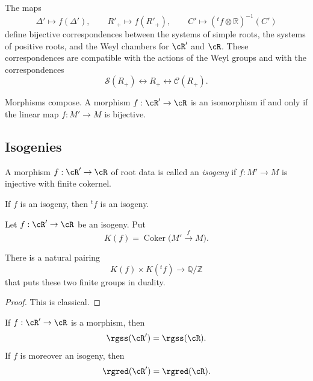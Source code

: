 \begin{proposition}\label{sga3:XXI:6.1.3}
The maps
\[
 \Delta'\longmapsto f(\Delta'),\qquad
 R'_+\longmapsto f(R'_+),\qquad
 C'\longmapsto({}^tf\otimes\mathbb R)^{-1}(C')
\]
define bijective correspondences between the systems of simple roots,
the systems of positive roots, and the Weyl chambers for \(\cR'\) and
\(\cR\). These correspondences are compatible with the actions of the
Weyl groups and with the correspondences
\[
 \mathscr{S}(R_+)\longleftrightarrow R_+
 \longleftrightarrow\mathscr{C}(R_+).
\]
\end{proposition}

\begin{lemma}\label{sga3:XXI:6.1.4}
Morphisms compose. A morphism \(f:\cR'\to\cR\) is an isomorphism if
and only if the linear map \(f:M'\to M\) is bijective.
\end{lemma}


\subsection{Isogenies}\label{sga3:XXI:6.2}

\begin{definition}\label{sga3:XXI:6.2.1}
A morphism \(f:\cR'\to\cR\) of root data is called an
\emph{isogeny} if \(f:M'\to M\) is injective with finite cokernel.
\end{definition}

If \(f\) is an isogeny, then \({}^tf\) is an isogeny.

\begin{definition}\label{sga3:XXI:6.2.2}
Let \(f:\cR'\to\cR\) be an isogeny. Put
\[
 K(f)=\operatorname{Coker}\bigl(M'\xrightarrow{f}M\bigr).
\]
\end{definition}

\begin{lemma}\label{sga3:XXI:6.2.3}
There is a natural pairing
\[
 K(f)\times K({}^tf)\longrightarrow\mathbb Q/\mathbb Z
\]
that puts these two finite groups in duality.
\end{lemma}

\begin{proof}
This is classical.
\end{proof}

\begin{lemma}\label{sga3:XXI:6.2.4}
If \(f:\cR'\to\cR\) is a morphism, then
\[
 \rgss(\cR')=\rgss(\cR).
\]
If \(f\) is moreover an isogeny, then
\[
 \rgred(\cR')=\rgred(\cR).
\]
\end{lemma}

